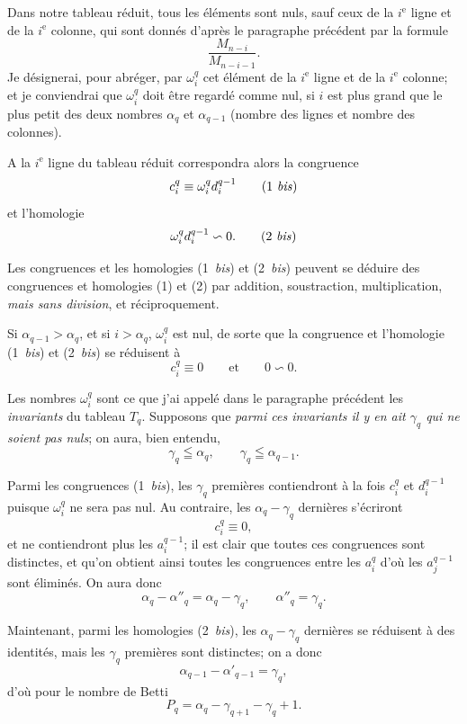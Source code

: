 \documentclass{article}
\begin{document}
Dans notre tableau réduit, tous les éléments sont nuls, sauf ceux de la $i^{\text{e}}$ ligne et de la $i^{\text{e}}$ colonne, qui sont donnés d'après le paragraphe précédent par la formule
\[ \frac{M_{n-i}}{M_{n-i-1}}. \]
Je désignerai, pour abréger, par $\omega^{q}_{i}$ cet élément de la $i^{\text{e}}$ ligne et de la $i^{\text{e}}$ colonne; et je conviendrai que $\omega^{q}_{i}$ doit être regardé comme nul, si $i$ est plus grand que le plus petit des deux nombres $\alpha_{q}$ et $\alpha_{q-1}$ (nombre des lignes et nombre des colonnes).

A la $i^{\text{e}}$ ligne du tableau réduit correspondra alors la congruence
\[ c^{q}_{i} \equiv \omega^{q}_{i} d^{q-1}_{i} \tag{1 \textit{bis}} \]
et l'homologie
\[ \omega^{q}_{i} d^{q-1}_{i} \backsim 0. \tag{2 \textit{bis}} \]

Les congruences et les homologies (1~\emph{bis}) et (2~\emph{bis}) peuvent se déduire des congruences et homologies (1) et (2) par addition, soustraction, multiplication, \emph{mais sans division}, et réciproquement.

Si $\alpha_{q-1} > \alpha_{q}$, et si $i > \alpha_{q}$, $\omega^{q}_{i}$ est nul, de sorte que la congruence et l'homologie (1~\emph{bis}) et (2~\emph{bis}) se réduisent à
\[ c^{q}_{i} \equiv 0 \qquad \text{et} \qquad 0 \backsim 0. \]

Les nombres $\omega^{q}_{i}$ sont ce que j'ai appelé dans le paragraphe précédent les \emph{invariants} du tableau $T_{q}$. Supposons que \emph{parmi ces invariants il y en ait $\gamma_{q}$ qui ne soient pas nuls}; on aura, bien entendu,
\[ \gamma_{q} \leqq \alpha_{q}, \qquad \gamma_{q} \leqq \alpha_{q-1}. \]

Parmi les congruences (1~\emph{bis}), les $\gamma_{q}$ premières contiendront à la fois $c^{q}_{i}$ et $d^{q-1}_{i}$ puisque $\omega^{q}_{i}$ ne sera pas nul. Au contraire, les $\alpha_{q} - \gamma_{q}$ dernières s'écriront
\[ c^{q}_{i} \equiv 0, \]
et ne contiendront plus les $a^{q-1}_{i}$; il est clair que toutes ces congruences sont distinctes, et qu'on obtient ainsi toutes les congruences entre les $a^{q}_{i}$ d'où les $a^{q-1}_{j}$ sont éliminés. On aura donc
\[ \alpha_{q} - \alpha''_{q} = \alpha_{q} - \gamma_{q}, \qquad \alpha''_{q} = \gamma_{q}. \]

Maintenant, parmi les homologies (2~\emph{bis}), les $\alpha_{q} - \gamma_{q}$ dernières se réduisent à des identités, mais les $\gamma_{q}$ premières sont distinctes; on a donc
\[ \alpha_{q-1} - \alpha'_{q-1} = \gamma_{q}, \]
d'où pour le nombre de Betti
\[ P_{q} = \alpha_{q} - \gamma_{q+1} - \gamma_{q} + 1. \]
\end{document}
